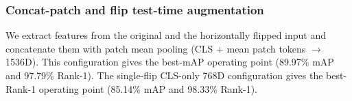 \subsubsection{Concat-patch and flip test-time augmentation}
We extract features from the original and the horizontally flipped input and concatenate them with patch mean pooling (CLS $+$ mean patch tokens $\to$ 1536D). This configuration gives the best-mAP operating point (89.97\% mAP and 97.79\% Rank-1). The single-flip CLS-only 768D configuration gives the best-Rank-1 operating point (85.14\% mAP and 98.33\% Rank-1).

